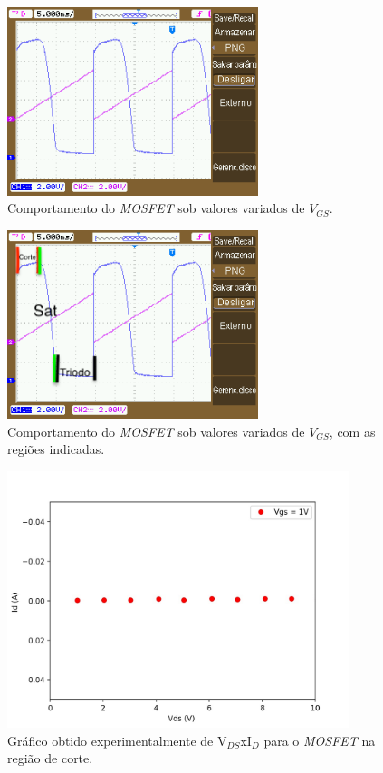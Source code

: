 \documentclass{article}
\begin{document}
\begin{figure}[h!]
    \centering
    \includegraphics[height=5.5cm]{imgSource/VdsxVgs.png}
    \caption{Comportamento do \emph{MOSFET} sob valores variados de $V_{GS}$.}
    \label{fig:mos_vds_vgs}
\end{figure}

\begin{figure}[h!]
    \centering
    \includegraphics[height=5.5cm]{imgSource/regioes.png}
    \caption{Comportamento do \emph{MOSFET} sob valores variados de $V_{GS}$, com as regiões indicadas.}
    \label{fig:regioes}
\end{figure}


\begin{figure}[h!]
    \centering
    \includegraphics[height=7.5cm]{imgSource/vgs1_exp.jpg}
    \caption{Gráfico obtido experimentalmente de V$_{DS}$xI$_{D}$ para o \emph{MOSFET} na região de corte.}
    \label{fig:mos_corte}
\end{figure}
\end{document}
